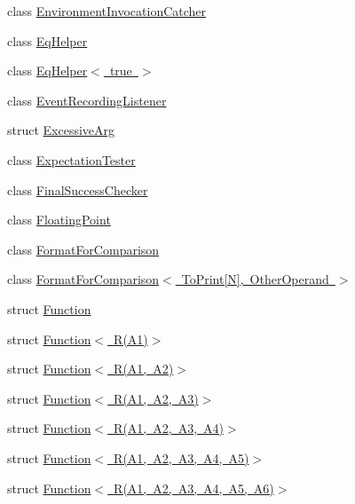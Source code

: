 \begin{DoxyCompactItemize}
\item 
class \mbox{\hyperlink{classtesting_1_1internal_1_1EnvironmentInvocationCatcher}{Environment\+Invocation\+Catcher}}
\item 
class \mbox{\hyperlink{classtesting_1_1internal_1_1EqHelper}{Eq\+Helper}}
\item 
class \mbox{\hyperlink{classtesting_1_1internal_1_1EqHelper_3_01true_01_4}{Eq\+Helper$<$ true $>$}}
\item 
class \mbox{\hyperlink{classtesting_1_1internal_1_1EventRecordingListener}{Event\+Recording\+Listener}}
\item 
struct \mbox{\hyperlink{structtesting_1_1internal_1_1ExcessiveArg}{Excessive\+Arg}}
\item 
class \mbox{\hyperlink{classtesting_1_1internal_1_1ExpectationTester}{Expectation\+Tester}}
\item 
class \mbox{\hyperlink{classtesting_1_1internal_1_1FinalSuccessChecker}{Final\+Success\+Checker}}
\item 
class \mbox{\hyperlink{classtesting_1_1internal_1_1FloatingPoint}{Floating\+Point}}
\item 
class \mbox{\hyperlink{classtesting_1_1internal_1_1FormatForComparison}{Format\+For\+Comparison}}
\item 
class \mbox{\hyperlink{classtesting_1_1internal_1_1FormatForComparison_3_01ToPrint[N]_00_01OtherOperand_01_4}{Format\+For\+Comparison$<$ To\+Print\mbox{[}\+N\mbox{]}, Other\+Operand $>$}}
\item 
struct \mbox{\hyperlink{structtesting_1_1internal_1_1Function}{Function}}
\item 
struct \mbox{\hyperlink{structtesting_1_1internal_1_1Function_3_01R_07A1_08_4}{Function$<$ R(\+A1)$>$}}
\item 
struct \mbox{\hyperlink{structtesting_1_1internal_1_1Function_3_01R_07A1_00_01A2_08_4}{Function$<$ R(\+A1, A2)$>$}}
\item 
struct \mbox{\hyperlink{structtesting_1_1internal_1_1Function_3_01R_07A1_00_01A2_00_01A3_08_4}{Function$<$ R(\+A1, A2, A3)$>$}}
\item 
struct \mbox{\hyperlink{structtesting_1_1internal_1_1Function_3_01R_07A1_00_01A2_00_01A3_00_01A4_08_4}{Function$<$ R(\+A1, A2, A3, A4)$>$}}
\item 
struct \mbox{\hyperlink{structtesting_1_1internal_1_1Function_3_01R_07A1_00_01A2_00_01A3_00_01A4_00_01A5_08_4}{Function$<$ R(\+A1, A2, A3, A4, A5)$>$}}
\item 
struct \mbox{\hyperlink{structtesting_1_1internal_1_1Function_3_01R_07A1_00_01A2_00_01A3_00_01A4_00_01A5_00_01A6_08_4}{Function$<$ R(\+A1, A2, A3, A4, A5, A6)$>$}}

\end{DoxyCompactItemize}
